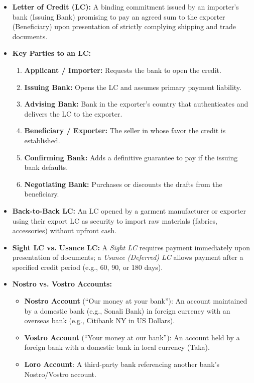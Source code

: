 \begin{itemize}
  \item \textbf{Letter of Credit (LC):} A binding commitment issued by an importer's bank (Issuing Bank) promising to pay an agreed sum to the exporter (Beneficiary) upon presentation of strictly complying shipping and trade documents.
  \item \textbf{Key Parties to an LC:}
  \begin{enumerate}
    \item \textbf{Applicant / Importer:} Requests the bank to open the credit.
    \item \textbf{Issuing Bank:} Opens the LC and assumes primary payment liability.
    \item \textbf{Advising Bank:} Bank in the exporter's country that authenticates and delivers the LC to the exporter.
    \item \textbf{Beneficiary / Exporter:} The seller in whose favor the credit is established.
    \item \textbf{Confirming Bank:} Adds a definitive guarantee to pay if the issuing bank defaults.
    \item \textbf{Negotiating Bank:} Purchases or discounts the drafts from the beneficiary.
  \end{enumerate}
  \item \textbf{Back-to-Back LC:} An LC opened by a garment manufacturer or exporter using their export LC as security to import raw materials (fabrics, accessories) without upfront cash.
  \item \textbf{Sight LC vs. Usance LC:} A \textit{Sight LC} requires payment immediately upon presentation of documents; a \textit{Usance (Deferred) LC} allows payment after a specified credit period (e.g., 60, 90, or 180 days).
  \item \textbf{Nostro vs. Vostro Accounts:}
  \begin{itemize}
    \item \textbf{Nostro Account} (``Our money at your bank''): An account maintained by a domestic bank (e.g., Sonali Bank) in foreign currency with an overseas bank (e.g., Citibank NY in US Dollars).
    \item \textbf{Vostro Account} (``Your money at our bank''): An account held by a foreign bank with a domestic bank in local currency (Taka).
    \item \textbf{Loro Account}: A third-party bank referencing another bank's Nostro/Vostro account.
  \end{itemize}
\end{itemize}

